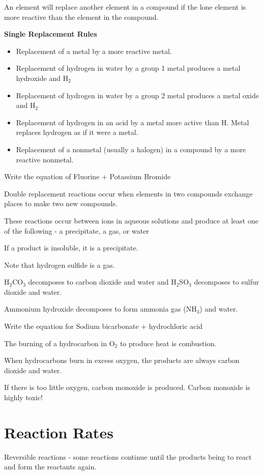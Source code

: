 \documentclass[../hchem.tex]{subfiles}
\begin{document}
An element will replace another element in a compound if the lone element is more reactive than the element in the compound.

\textbf{Single Replacement Rules}
\begin{itemize}
    \item Replacement of a metal by a more reactive metal.
    \item Replacement of hydrogen in water by a group 1 metal produces a metal hydroxide and H$_2$
    \item Replacement of hydrogen in water by a group 2 metal produces a metal oxide and H$_2$
    \item Replacement of hydrogen in an acid by a metal more active than H. Metal replaces hydrogen as if it were a metal.
    \item Replacement of a nonmetal (usually a halogen) in a compound by a more reactive nonmetal.
\end{itemize}

\ex Write the equation of Fluorine + Potassium Bromide

Double replacement reactions occur when elements in two compounds exchange places to make two new compounds.

These reactions occur between ions in aqueous solutions and produce at least one of the following - a precipitate, a gas, or water

If a product is insoluble, it is a precipitate.

Note that hydrogen sulfide is a gas.

H$_2$CO$_3$ decomposes to carbon dioxide and water and H$_2$SO$_3$ decomposes to sulfur dioxide and water.

Ammonium hydroxide decomposes to form ammonia gas (NH$_3$) and water.

\ex Write the equation for Sodium bicarbonate + hydrochloric acid 

The burning of a hydrocarbon in O$_2$ to produce heat is combustion.

When hydrocarbons burn in excess oxygen, the products are always carbon dioxide and water.

If there is too little oxygen, carbon monoxide is produced. Carbon monoxide is highly toxic!
\section{Reaction Rates}
Reversible reactions - some reactions continue until the products being to react and form the reactants again.
\end{document}
